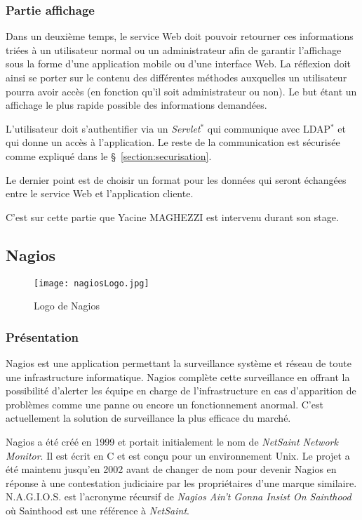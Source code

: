 \subsubsection{Partie affichage}

Dans un deuxi\`eme temps, le service Web doit pouvoir retourner ces informations tri\'ees \`a un utilisateur normal ou un administrateur afin de garantir l'affichage sous la forme d'une application mobile ou d'une interface Web.
La r\'eflexion doit ainsi se porter sur le contenu des diff\'erentes m\'ethodes auxquelles un utilisateur pourra avoir acc\`es (en fonction qu'il soit administrateur ou non).
Le but \'etant un affichage le plus rapide possible des informations demand\'ees.

L'utilisateur doit s'authentifier via un \textit{Servlet}$^*$ qui communique avec LDAP$^*$ et qui donne un acc\`es \`a l'application.
Le reste de la communication est s\'ecuris\'ee comme expliqu\'e dans le \S~\ref{section:securisation}.

Le dernier point est de choisir un format pour les donn\'ees qui seront \'echang\'ees entre le service Web et l'application cliente.

C'est sur cette partie que Yacine MAGHEZZI est intervenu durant son stage.

\subsection{Nagios}
\label{section:nagios}

\begin{figure}[!ht]
	\centering
	\texttt{[image: nagiosLogo.jpg]}
	\caption{Logo de Nagios}

\end{figure}

\subsubsection{Pr\'esentation}

Nagios est une application permettant la surveillance syst\`eme et r\'eseau de toute une infrastructure informatique.
Nagios compl\`ete cette surveillance en offrant la possibilit\'e d'alerter les \'equipe en charge de l'infrastructure en cas d'apparition de probl\`emes comme une panne ou encore un fonctionnement anormal.
C'est actuellement la solution de surveillance la plus efficace du march\'e.

Nagios a \'et\'e cr\'e\'e en 1999 et portait initialement le nom de \textit{NetSaint Network Monitor}.
Il est \'ecrit en C et est con\c{c}u pour un environnement Unix.
Le projet a \'et\'e maintenu jusqu'en 2002 avant de changer de nom pour devenir Nagios en r\'eponse \`a une contestation judiciaire par les propri\'etaires d'une marque similaire.
N.A.G.I.O.S. est l'acronyme r\'ecursif de \og{}\textit{Nagios Ain't Gonna Insist On Sainthood}\fg{} o\`u Sainthood est une r\'ef\'erence \`a \textit{NetSaint}.

